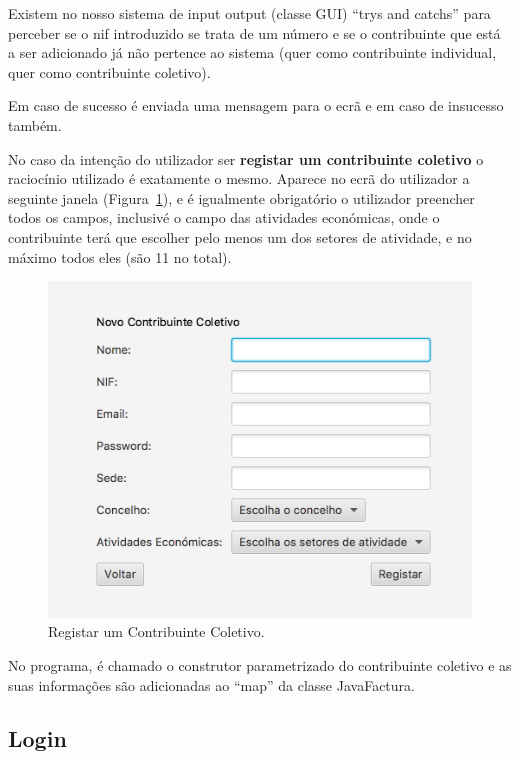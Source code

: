 \documentclass[a4paper]{article}
\begin{document}
\begin{itemize}
Existem no nosso sistema de input output (classe \textsf{GUI})
``trys and catchs'' para perceber se o nif introduzido se trata de um número
e se o contribuinte que está a ser adicionado já não pertence ao sistema (quer
como contribuinte individual, quer como contribuinte coletivo).

Em caso de sucesso é enviada uma mensagem para o ecrã e em caso de insucesso também.


\vspace{0.4cm}


No caso da intenção do utilizador ser \textbf{registar um contribuinte coletivo} o raciocínio
utilizado é exatamente o mesmo. Aparece no ecrã do utilizador a seguinte janela
(Figura~\ref{img:criarcc}), e é igualmente obrigatório o utilizador preencher
todos os campos, inclusivé
o campo das atividades económicas, onde o contribuinte terá que escolher pelo menos um
dos setores de atividade, e no máximo todos eles (são 11 no total).

\begin{figure}[H]
\centering
\includegraphics[scale=0.40]{imgs/criarcc.png}
\caption{Registar um Contribuinte Coletivo.}
\label{img:criarcc}
\end{figure}

No programa, é chamado o construtor parametrizado do contribuinte coletivo e as suas
informações são adicionadas ao ``map'' da classe \textsf{JavaFactura}.



\subsection{Login}
\label{sec:login}


\end{itemize}
\end{document}
